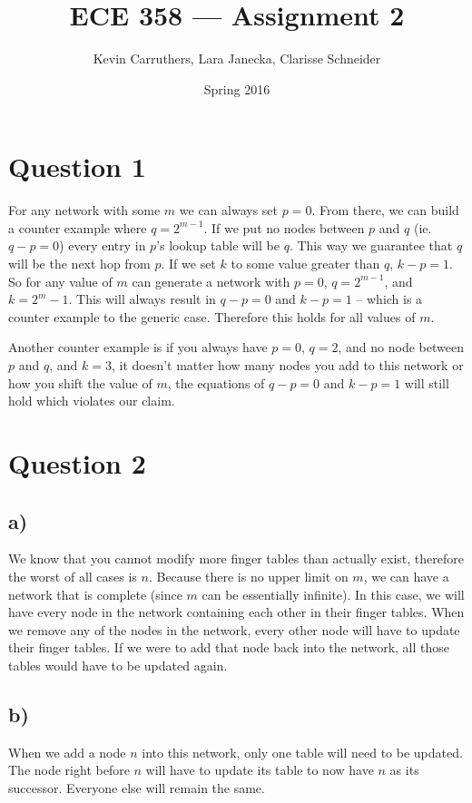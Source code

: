 \documentclass[12pt]{article}
\begin{document}
\title{ECE 358 --- Assignment 2}
\author{Kevin Carruthers, Lara Janecka, Clarisse Schneider}
\date{\vspace{-2ex}Spring 2016}
\maketitle\HRule

\section*{Question 1}
For any network with some $m$ we can always set $p = 0$. From there, we can build a counter example where $q = 2^{m-1}$. If we put no nodes between $p$ and $q$ (ie. $q-p = 0$) every entry in $p$'s lookup table will be $q$. This way we guarantee that $q$ will be the next hop from $p$. If we set $k$ to some value greater than $q$, $k-p=1$. So for any value of $m$ can generate a network with $p = 0$, $q = 2^{m-1}$, and $k = 2^m-1$. This will always result in $q-p=0$ and $k-p=1$ -- which is a counter example to the generic case. Therefore this holds for all values of $m$.

Another counter example is if you always have $p = 0$, $q = 2$, and no node between $p$ and $q$, and $k = 3$, it doesn't matter how many nodes you add to this network or how you shift the value of $m$, the equations of $q-p=0$ and $k-p=1$ will still hold which violates our claim.

\section*{Question 2}
\subsection*{a)}
We know that you cannot modify more finger tables than actually exist, therefore the worst of all cases is $n$. Because there is no upper limit on $m$, we can have a network that is complete (since $m$ can be essentially infinite). In this case, we will have every node in the network containing each other in their finger tables. When we remove any of the nodes in the network, every other node will have to update their finger tables. If we were to add that node back into the network, all those tables would have to be updated again.

\subsection*{b)}
When we add a node $n$ into this network, only one table will need to be updated. The node right before $n$ will have to update its table to now have $n$ as its successor. Everyone else will remain the same.
\end{document}
